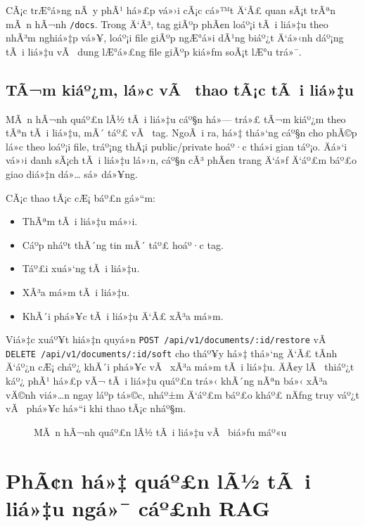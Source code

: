 ﻿\documentclass[12pt,a4paper]{report}
\begin{document}
CÃ¡c trÆ°á»ng nÃ y phÃ¹ há»£p vá»›i cÃ¡c cá»™t Ä‘Ã£ quan sÃ¡t trÃªn mÃ n hÃ¬nh \texttt{/docs}. Trong Ä‘Ã³, tag giÃºp phÃ¢n loáº¡i tÃ i liá»‡u theo nhÃ³m nghiá»‡p vá»¥, loáº¡i file giÃºp ngÆ°á»i dÃ¹ng biáº¿t Ä‘á»‹nh dáº¡ng tÃ i liá»‡u vÃ  dung lÆ°á»£ng file giÃºp kiá»ƒm soÃ¡t lÆ°u trá»¯.

\subsection{TÃ¬m kiáº¿m, lá»c vÃ  thao tÃ¡c tÃ i liá»‡u}

MÃ n hÃ¬nh quáº£n lÃ½ tÃ i liá»‡u cáº§n há»— trá»£ tÃ¬m kiáº¿m theo tÃªn tÃ i liá»‡u, mÃ´ táº£ vÃ  tag. NgoÃ i ra, há»‡ thá»‘ng cáº§n cho phÃ©p lá»c theo loáº¡i file, tráº¡ng thÃ¡i public/private hoáº·c thá»i gian táº¡o. Äá»‘i vá»›i danh sÃ¡ch tÃ i liá»‡u lá»›n, cáº§n cÃ³ phÃ¢n trang Ä‘á»ƒ Ä‘áº£m báº£o giao diá»‡n dá»… sá»­ dá»¥ng.

CÃ¡c thao tÃ¡c cÆ¡ báº£n gá»“m:

\begin{itemize}
    \item ThÃªm tÃ i liá»‡u má»›i.
    \item Cáº­p nháº­t thÃ´ng tin mÃ´ táº£ hoáº·c tag.
    \item Táº£i xuá»‘ng tÃ i liá»‡u.
    \item XÃ³a má»m tÃ i liá»‡u.
    \item KhÃ´i phá»¥c tÃ i liá»‡u Ä‘Ã£ xÃ³a má»m.
\end{itemize}

Viá»‡c xuáº¥t hiá»‡n quyá»n \texttt{POST /api/v1/documents/:id/restore} vÃ  \texttt{DELETE /api/v1/documents/:id/soft} cho tháº¥y há»‡ thá»‘ng Ä‘Ã£ tÃ­nh Ä‘áº¿n cÆ¡ cháº¿ khÃ´i phá»¥c vÃ  xÃ³a má»m tÃ i liá»‡u. ÄÃ¢y lÃ  thiáº¿t káº¿ phÃ¹ há»£p vÃ¬ tÃ i liá»‡u quáº£n trá»‹ khÃ´ng nÃªn bá»‹ xÃ³a vÄ©nh viá»…n ngay láº­p tá»©c, nháº±m Ä‘áº£m báº£o kháº£ nÄƒng truy váº¿t vÃ  phá»¥c há»“i khi thao tÃ¡c nháº§m.

\begin{figure}[H]
    \centering
    \caption{MÃ n hÃ¬nh quáº£n lÃ½ tÃ i liá»‡u vÃ  biá»ƒu máº«u}
    \label{fig:docs-management}
\end{figure}

\section{PhÃ¢n há»‡ quáº£n lÃ½ tÃ i liá»‡u ngá»¯ cáº£nh RAG}
\end{document}
